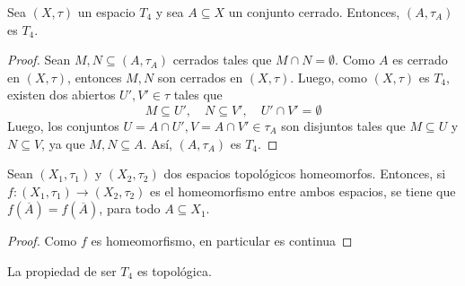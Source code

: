 \documentclass[12pt]{report}
\theoremstyle{largebreak}
\newcommand\cf[3]{\ensuremath{#1:#2\rightarrow#3}}
\newcommand{\Cls}[1]{\ensuremath{\overline{#1}}}
\begin{document}
    \begin{propo}
        Sea $(X,\tau)$ un espacio $T_4$ y sea $A\subseteq X$ un conjunto cerrado. Entonces, $(A,\tau_A)$ es $T_4$.
    \end{propo}

    \begin{proof}
        Sean $M,N\subseteq(A,\tau_A)$ cerrados tales que $M\cap N=\emptyset$. Como $A$ es cerrado en $(X,\tau)$, entonces $M,N$ son cerrados en $(X,\tau)$. Luego, como $(X,\tau)$ es $T_4$, existen dos abiertos $U',V'\in\tau$ tales que
        \begin{equation*}
            M\subseteq U',\quad N\subseteq V',\quad U'\cap V'=\emptyset
        \end{equation*}
        Luego, los conjuntos $U=A\cap U',V=A\cap V'\in\tau_A$ son disjuntos tales que $M\subseteq U$ y $N\subseteq V$, ya que $M,N\subseteq A$. Así, $(A,\tau_A)$ es $T_4$.
    \end{proof}

    \begin{lema}
        Sean $(X_1,\tau_1)$ y $(X_2,\tau_2)$ dos espacios topológicos homeomorfos. Entonces, si $\cf{f}{(X_1,\tau_1)}{(X_2,\tau_2)}$ es el homeomorfismo entre ambos espacios, se tiene que $f(\Cls{A})=f(\Cls{A})$, para todo $A\subseteq X_1$.
    \end{lema}

    \begin{proof}
        Como $f$ es homeomorfismo, en particular es continua
    \end{proof}

    \begin{propo}
        La propiedad de ser $T_4$ es topológica.
    \end{propo}
\end{document}
